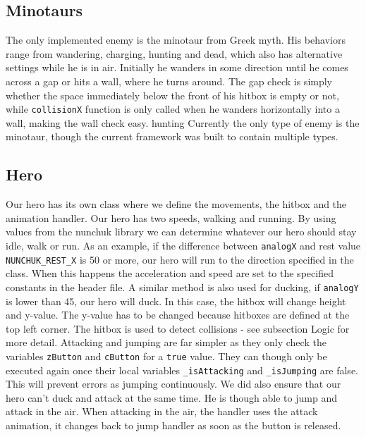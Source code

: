 \subsection*{Minotaurs} %
The only implemented enemy is the minotaur from Greek myth. His behaviors range from wandering, charging, hunting and dead, which also has alternative settings while he is in air. Initially he wanders in some direction until he comes across a gap or hits a wall, where he turns around. The gap check is simply whether the space immediately below the front of his hitbox is empty or not, while {\tt collisionX} function is only called when he wanders horizontally into a wall, making the wall check easy.
hunting
\newline
Currently the only type of enemy is the minotaur, though the current framework was built to contain multiple types.

\subsection*{Hero}
Our hero has its own class where we define the movements, the hitbox and
the animation handler.
\newline
Our hero has two speeds, walking and running. By using values from the nunchuk library we can determine whatever our hero should stay idle, walk or run. As an example, if the difference between {\tt analogX} and rest value {\tt NUNCHUK\_REST\_X} is 50 or more, our hero will run to the direction specified in the class. When this happens the acceleration and speed are set to the specified constants in the header file.  A similar method is also used for ducking, if {\tt analogY} is lower than 45, our hero will duck. In this case, the hitbox will change height and y-value. The y-value has to be changed because hitboxes are defined at the top left corner. The hitbox is used to detect collisions - see subsection Logic for more detail.
\newline
Attacking and jumping are far simpler as they only check the variables {\tt zButton} and {\tt cButton} for a {\tt true} value. They can though only be executed again once their local variables {\tt \_isAttacking} and {\tt \_isJumping} are false. This will prevent errors as jumping continuously. We did also ensure that our hero can't duck and attack at the same time. He is though able to jump and attack in the air. When attacking in the air, the handler uses the attack animation, it changes back to jump handler as soon as the button is released.

